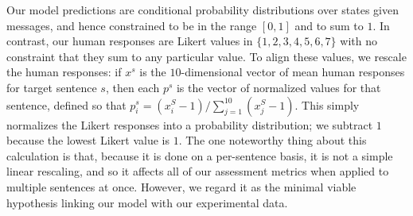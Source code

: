 \documentclass[leqno,12pt]{article}
\begin{document}

Our model predictions are conditional probability distributions over
states given messages, and hence constrained to be in the range
$[0,1]$ and to sum to $1$. In contrast, our human responses are Likert
values in $\{1,2,3,4,5,6,7\}$ with no constraint that they sum to
any particular value. To align these values, we rescale the human responses: if $x^{s}$
is the $10$-dimensional vector of mean human responses for target
sentence $s$, then each $p^{s}$ is the vector of normalized values for
that sentence, defined so that
$p^{s}_{i} = (x^{S}_{i}-1)/\sum_{j=1}^{10}(x^{S}_{j}-1)$. This simply
normalizes the Likert responses into a probability distribution; we
subtract $1$ because the lowest Likert value is $1$. The one
noteworthy thing about this calculation is that, because it is done on
a per-sentence basis, it is not a simple linear rescaling, and so it
affects all of our assessment metrics when applied to multiple
sentences at once. However, we regard it as the minimal viable
hypothesis linking our model with our experimental data.
\end{document}
